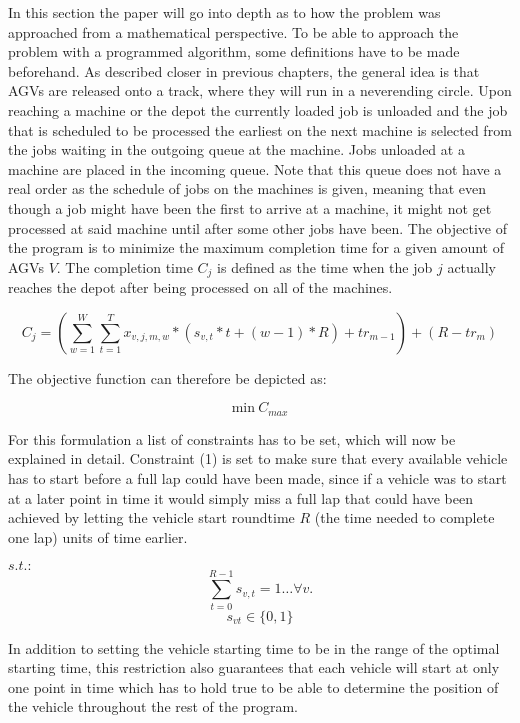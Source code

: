 \setcounter{equation}{0}
In this section the paper will go into depth as to how the problem was approached from a mathematical perspective. To be able to approach the problem
with a programmed algorithm, some definitions have to be made beforehand. As described closer in previous chapters, the general idea is that AGVs
are released onto a track, where they will run in a neverending circle. Upon reaching a machine or the depot the currently loaded job is unloaded and
the job that is scheduled to be processed the earliest on the next machine is selected from the jobs waiting in the outgoing queue at the machine.
Jobs unloaded at a machine are placed in the incoming queue. Note that this queue does not have a real order as the schedule of jobs on the machines is
given, meaning that even though a job might have been the first to arrive at a machine, it might not get processed at said machine until after some
other jobs have been. The objective of the program is to minimize the maximum completion time for a given amount of AGVs \(V\). The completion time
\(C_{j}\) is defined as the time when the job \(j\) actually reaches the depot after being processed on all of the machines.

\[
  C_{j} = (\sum_{w=1}^{W}\sum_{t=1}^{T} x_{v,j,m,w} * (s_{v,t} * t + (w-1) * R) + tr_{m-1}) + (R-tr_{m})
\]

The objective function can therefore be depicted as:

\begin{equation}
\mathrm{min}\>C_{max}
\end{equation}

For this formulation a list of constraints has to be set, which will now be explained in detail. Constraint (1) is set to make sure
that every available vehicle has to start before a full lap could have been made, since if a vehicle was to start at a later point in time it would
simply miss a full lap that could have been achieved by letting the vehicle start roundtime \(R\) (the time needed to complete one lap) units of time earlier.

\(s.t.:\)
\begin{equation}
\sum_{t=0}^{R-1}s_{v,t} = 1\ldots \forall v.
\end{equation}
\begin{equation}
s_{v t}\in\{0,1\}
\end{equation}

In addition to setting the vehicle starting time to be in the range of the optimal starting time, this restriction also guarantees that each vehicle
will start at only one point in time which has to hold true to be able to determine the position of the vehicle throughout the rest of the program.

